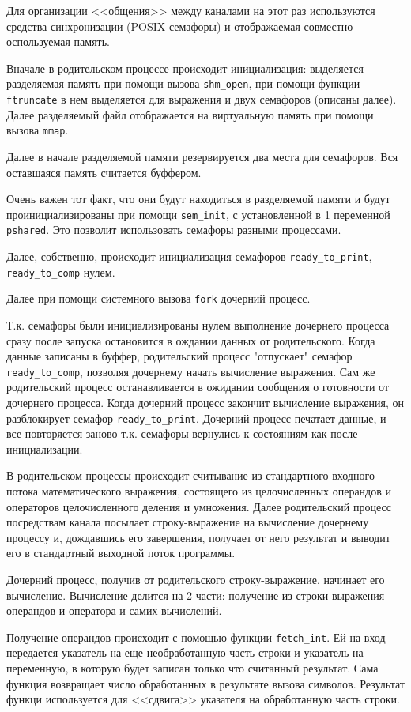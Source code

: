 \documentclass[12pt]{article}
\begin{document}
Для организации <<общения>> между каналами на этот раз используются средства синхронизации (POSIX-семафоры) и отображаемая совместно оспользуемая память.

Вначале в родительском процессе происходит инициализация:
выделяется разделяемая память при помощи вызова \verb|shm_open|, при помощи функции \verb|ftruncate| в нем выделяется для выражения и двух семафоров (описаны далее). Далее разделяемый файл отображается на виртуальную память при помощи вызова \verb|mmap|.

Далее в начале разделяемой памяти резервируется два места для семафоров. Вся оставшаяся память считается буффером.

Очень важен тот факт, что они будут находиться в разделяемой памяти и будут проинициализированы при помощи \verb|sem_init|, с установленной в 1 переменной \verb|pshared|. Это позволит использовать семафоры разными процессами.

Далее, собственно, происходит инициализация семафоров \verb|ready_to_print|, \verb|ready_to_comp| нулем. 

Далее при помощи системного вызова  \verb|fork| дочерний процесс.

Т.к. семафоры были инициализированы нулем выполнение дочернего процесса сразу после запуска остановится в ождании данных от родительского. Когда данные записаны в буффер, родительский процесс "отпускает" семафор \verb|ready_to_comp|, позволяя дочернему начать вычисление выражения. Сам же родительский процесс останавливается в ожидании сообщения о готовности от дочернего процесса. Когда дочерний процесс закончит вычисление выражения, он разблокирует семафор \verb|ready_to_print|. Дочерний процесс печатает данные, и все повторяется заново т.к. семафоры вернулись к состояниям как после инициализации.

В родительском процессы происходит считывание из стандартного входного потока математического выражения, состоящего из целочисленных операндов и операторов целочисленного деления и умножения. Далее родительский процесс посредствам канала посылает строку-выражение на вычисление дочернему процессу и, дождавшись его завершения, получает от него результат и выводит его в стандартный выходной поток программы. 

Дочерний процесс, получив от родительского строку-выражение, начинает его вычисление. Вычисление делится на 2 части: получение из строки-выражения операндов и оператора и самих вычислений.

Получение операндов происходит с помощью функции \verb|fetch_int|. Ей на вход передается указатель на еще необработанную часть строки и указатель на переменную, в которую будет записан только что считанный результат. Сама функция возвращает число обработанных в результате вызова символов. Результат функци используется для <<сдвига>> указателя на обработанную часть строки.
\end{document}
